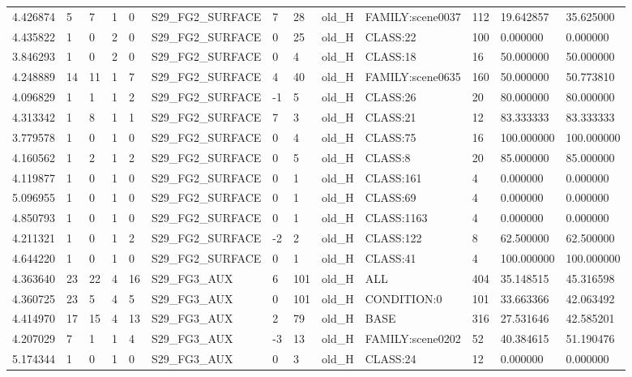 \begin{tabular}{lllllllllllll}
4.426874 & 5 & 7 & 1 & 0 & S29\_FG2\_SURFACE & 7 & 28 & old\_H & FAMILY:scene0037 & 112 & 19.642857 & 35.625000 \\
4.435822 & 1 & 0 & 2 & 0 & S29\_FG2\_SURFACE & 0 & 25 & old\_H & CLASS:22 & 100 & 0.000000 & 0.000000 \\
3.846293 & 1 & 0 & 2 & 0 & S29\_FG2\_SURFACE & 0 & 4 & old\_H & CLASS:18 & 16 & 50.000000 & 50.000000 \\
4.248889 & 14 & 11 & 1 & 7 & S29\_FG2\_SURFACE & 4 & 40 & old\_H & FAMILY:scene0635 & 160 & 50.000000 & 50.773810 \\
4.096829 & 1 & 1 & 1 & 2 & S29\_FG2\_SURFACE & -1 & 5 & old\_H & CLASS:26 & 20 & 80.000000 & 80.000000 \\
4.313342 & 1 & 8 & 1 & 1 & S29\_FG2\_SURFACE & 7 & 3 & old\_H & CLASS:21 & 12 & 83.333333 & 83.333333 \\
3.779578 & 1 & 0 & 1 & 0 & S29\_FG2\_SURFACE & 0 & 4 & old\_H & CLASS:75 & 16 & 100.000000 & 100.000000 \\
4.160562 & 1 & 2 & 1 & 2 & S29\_FG2\_SURFACE & 0 & 5 & old\_H & CLASS:8 & 20 & 85.000000 & 85.000000 \\
4.119877 & 1 & 0 & 1 & 0 & S29\_FG2\_SURFACE & 0 & 1 & old\_H & CLASS:161 & 4 & 0.000000 & 0.000000 \\
5.096955 & 1 & 0 & 1 & 0 & S29\_FG2\_SURFACE & 0 & 1 & old\_H & CLASS:69 & 4 & 0.000000 & 0.000000 \\
4.850793 & 1 & 0 & 1 & 0 & S29\_FG2\_SURFACE & 0 & 1 & old\_H & CLASS:1163 & 4 & 0.000000 & 0.000000 \\
4.211321 & 1 & 0 & 1 & 2 & S29\_FG2\_SURFACE & -2 & 2 & old\_H & CLASS:122 & 8 & 62.500000 & 62.500000 \\
4.644220 & 1 & 0 & 1 & 0 & S29\_FG2\_SURFACE & 0 & 1 & old\_H & CLASS:41 & 4 & 100.000000 & 100.000000 \\
4.363640 & 23 & 22 & 4 & 16 & S29\_FG3\_AUX & 6 & 101 & old\_H & ALL & 404 & 35.148515 & 45.316598 \\
4.360725 & 23 & 5 & 4 & 5 & S29\_FG3\_AUX & 0 & 101 & old\_H & CONDITION:0 & 101 & 33.663366 & 42.063492 \\
4.414970 & 17 & 15 & 4 & 13 & S29\_FG3\_AUX & 2 & 79 & old\_H & BASE & 316 & 27.531646 & 42.585201 \\
4.207029 & 7 & 1 & 1 & 4 & S29\_FG3\_AUX & -3 & 13 & old\_H & FAMILY:scene0202 & 52 & 40.384615 & 51.190476 \\
5.174344 & 1 & 0 & 1 & 0 & S29\_FG3\_AUX & 0 & 3 & old\_H & CLASS:24 & 12 & 0.000000 & 0.000000 \\

\end{tabular}

